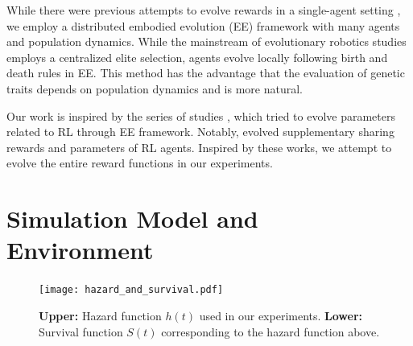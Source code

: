 While there were previous attempts to evolve rewards in a single-agent setting \citep{singhWhereRewardsCome2009,niekumEvolutionRewardFunctions2011,zhengWhatCanLearned2020},
we employ a distributed embodied evolution (EE) framework \citep{watsonEmbodiedEvolutionDistributing2002,bredecheEmbodiedEvolutionCollective2018} with many agents and population dynamics.
While the mainstream of evolutionary robotics studies \citep{nolfiEvolutionaryRoboticsBiology2004} employs a centralized elite selection, agents evolve locally following birth and death rules in EE. This method has the advantage that the evaluation of genetic traits depends on population dynamics and is more natural.

Our work is inspired by the series of studies \citep{elfwingBiologicallyInspiredEmbodied2005,elfwingDarwinianEmbodiedEvolution2011,elfwingEmergencePolymorphicMating2014}, which tried to evolve parameters related to RL through EE framework. Notably, \citet{elfwingDarwinianEmbodiedEvolution2011} evolved supplementary sharing rewards and parameters of RL agents.
Inspired by these works, we attempt to evolve the entire reward functions in our experiments.

\section{Simulation Model and Environment}\label{sec:method}

\begin{figure}[t]
  \centering{}
  \texttt{[image: hazard\_and\_survival.pdf]}
  \caption{
    \textbf{Upper:} Hazard function $h(t)$ used in our experiments.
    \textbf{Lower:} Survival function $S(t)$ corresponding to the hazard function above.
  }\label{figure:hs}
\end{figure}

